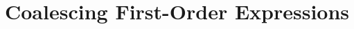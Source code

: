 \documentclass{easychair}
\newcommand{\sem}[1]{\ensuremath{[\![ #1 ]\!]}}
\newcommand{\false}{\textsf{ff}}
\newcommand{\FOL}[1]{\ensuremath{#1_{\textit{\scriptsize FOL}}}}
\newcommand{\folmodels}{\mathop{\models_{\textit{\scriptsize FOL}}}}
\newcommand{\btu}{\Box}
\newcommand{\fpr}{\overline}
\newcommand{\II}{\mathcal{I}}
\newcommand{\MM}{\mathcal{M}}
\renewcommand{\SS}{\mathcal{S}}
\newcommand{\VV}{\mathcal{V}}
\newcommand{\WW}{\mathcal{W}}
\newcommand{\XX}{\mathcal{X}}
\newcommand{\B}[1]{\framebox{\rule{0pt}{.6em}\ensuremath{\!\tlachars #1\!}}\,}
\newtheorem{theorem}{Theorem}
\newenvironment{proofsketch}{\par\noindent\textbf{Proof (sketch).}\quad}{\medskip\par\noindent}
\let\tlachars\relax
\begin{document}


\section{Coalescing First-Order Expressions}
\label{sec:coalescing-fol}
\end{document}
